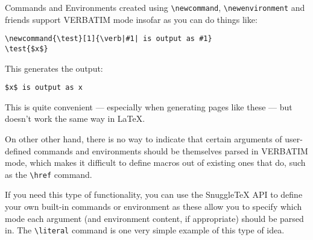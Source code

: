 Commands and Environments created using \verb|\newcommand|,
\verb|\newenvironment| and friends support VERBATIM mode insofar
as you can do things like:

\begin{verbatim}
\newcommand{\test}[1]{\verb|#1| is output as #1}
\test{$x$}
\end{verbatim}

This generates the output:

\begin{verbatim}
$x$ is output as x
\end{verbatim}

This is quite convenient --- especially when generating pages like these ---
but doesn't work the same way in LaTeX.

On other other hand, there is no way to indicate that certain arguments
of user-defined commands and environments should be themselves parsed in
VERBATIM mode, which makes it difficult to define macros out of existing
ones that do, such as the \verb|\href| command.

If you need this type of functionality, you can use the SnuggleTeX API to
define your own built-in commands or environment as these allow you to specify
which mode each argument (and environment content, if appropriate) should be
parsed in. The \verb|\literal| command is one very simple example of this
type of idea.
